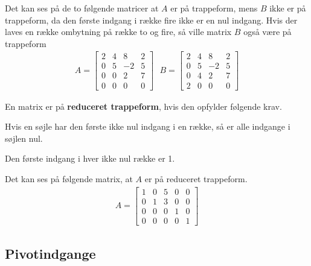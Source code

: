 \begin{eks}
Det kan ses på de to følgende matricer at $A$ er på trappeform, mens $B$ ikke er på trappeform, da den første indgang i række fire ikke er en nul indgang. Hvis der laves en række ombytning på række to og fire, så ville matrix $B$ også være på trappeform
\begin{align*}
A=
\begin{bmatrix}
2 & 4 & 8 & 2\\
0 & 5 & -2 & 5\\
0 & 0 & 2 & 7\\
0 & 0 & 0 & 0
\end{bmatrix}
\text{ }
B=
\begin{bmatrix}
2 & 4 & 8 & 2\\
0 & 5 & -2 & 5\\
0 & 4 & 2 & 7\\
2 & 0 & 0 & 0
\end{bmatrix}
\end{align*}

\end{eks}

\begin{defn}{}{}
En matrix er på \textbf{reduceret trappeform}, hvis den opfylder følgende krav.
\itemize
\item Hvis en søjle har den første ikke nul indgang i en række, så er alle indgange i søjlen nul.
\item Den første indgang i hver ikke nul række er 1. 
\end{defn}

\begin{eks}
Det kan ses på følgende matrix, at $A$ er på reduceret trappeform.
\begin{align*}
A=
\begin{bmatrix}
1 & 0 & 5 & 0 & 0\\
0 & 1 & 3 & 0 & 0\\
0 & 0 & 0 & 1 & 0\\
0 & 0 & 0 & 0 & 1
\end{bmatrix}
\end{align*}
\end{eks}

\subsection{Pivotindgange}